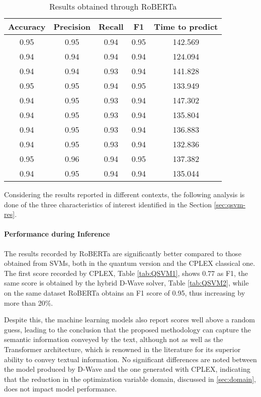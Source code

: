\begin{table}[h]
    \centering
    \begin{tabular}{ccccc}
    \toprule
    Accuracy & Precision & Recall & F1    & Time to predict \\
    \midrule
    0.95     & 0.95      & 0.94   & 0.95  & 142.569         \\
    0.94     & 0.94      & 0.94   & 0.94  & 124.094         \\
    0.94     & 0.94      & 0.93   & 0.94  & 141.828         \\
    0.95     & 0.95      & 0.94   & 0.95  & 133.949         \\
    0.94     & 0.95      & 0.93   & 0.94  & 147.302         \\
    0.94     & 0.95      & 0.93   & 0.94  & 135.804         \\
    0.94     & 0.95      & 0.93   & 0.94  & 136.883         \\
    0.94     & 0.95      & 0.93   & 0.94  & 132.836         \\
    0.95     & 0.96      & 0.94   & 0.95  & 137.382         \\
    0.94     & 0.95      & 0.94   & 0.94  & 135.044         \\
    \bottomrule
    \end{tabular}
    \caption{Results obtained through RoBERTa}
    \label{tab:QSVM3}
\end{table}

Considering the results reported in different contexts, the following analysis is done of the three characteristics of interest identified in the Section \ref{sec:qsvm-res}.

\paragraph{Performance during Inference} The results recorded by RoBERTa are significantly better compared to those obtained from SVMs, both in the quantum version and the CPLEX classical one.
The first score recorded by CPLEX, Table \ref{tab:QSVM1}, shows 0.77 as F1, the same score is obtained by the hybrid D-Wave solver, Table \ref{tab:QSVM2}, while on the same dataset RoBERTa obtains an F1 score of 0.95, thus increasing by more than 20\%.

Despite this, the machine learning models also report scores well above a random guess, leading to the conclusion that the proposed methodology can capture the semantic information conveyed by the text, although not as well as the Transformer architecture, which is renowned in the literature for its superior ability to convey textual information. No significant differences are noted between the model produced by D-Wave and the one generated with CPLEX, indicating that the reduction in the optimization variable domain, discussed in \ref{sec:domain}, does not impact model performance.

